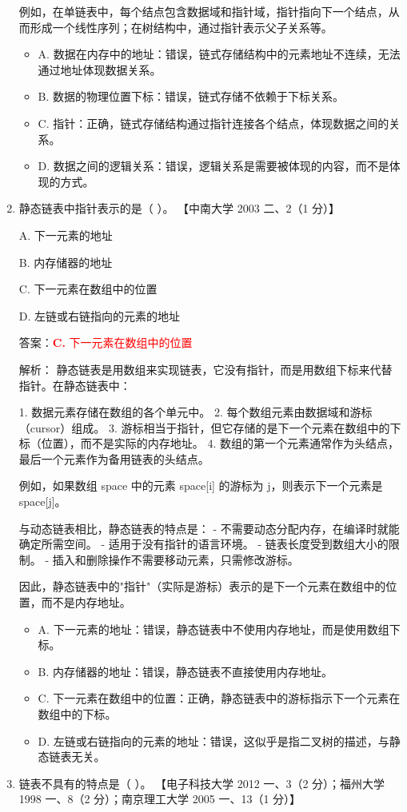 \documentclass[lang=cn,newtx,10pt,scheme=chinese]{../../../elegantbook}
\begin{document}
\begin{enumerate}
        例如，在单链表中，每个结点包含数据域和指针域，指针指向下一个结点，从而形成一个线性序列；在树结构中，通过指针表示父子关系等。

        \begin{itemize}
            \item A. 数据在内存中的地址：错误，链式存储结构中的元素地址不连续，无法通过地址体现数据关系。
            \item B. 数据的物理位置下标：错误，链式存储不依赖于下标关系。
            \item C. 指针：正确，链式存储结构通过指针连接各个结点，体现数据之间的关系。
            \item D. 数据之间的逻辑关系：错误，逻辑关系是需要被体现的内容，而不是体现的方式。
        \end{itemize}
        \item 静态链表中指针表示的是（ ）。  
        【中南大学 2003 二、2（1 分）】  
    
        A. 下一元素的地址  
    
        B. 内存储器的地址 
    
        C. 下一元素在数组中的位置  
    
        D. 左链或右链指向的元素的地址  
    
        答案：\textcolor{red}{\textbf{C.} 下一元素在数组中的位置}

        解析：
        静态链表是用数组来实现链表，它没有指针，而是用数组下标来代替指针。在静态链表中：

        1. 数据元素存储在数组的各个单元中。
        2. 每个数组元素由数据域和游标（cursor）组成。
        3. 游标相当于指针，但它存储的是下一个元素在数组中的下标（位置），而不是实际的内存地址。
        4. 数组的第一个元素通常作为头结点，最后一个元素作为备用链表的头结点。

        例如，如果数组 space 中的元素 space[i] 的游标为 j，则表示下一个元素是 space[j]。

        与动态链表相比，静态链表的特点是：
        - 不需要动态分配内存，在编译时就能确定所需空间。
        - 适用于没有指针的语言环境。
        - 链表长度受到数组大小的限制。
        - 插入和删除操作不需要移动元素，只需修改游标。

        因此，静态链表中的"指针"（实际是游标）表示的是下一个元素在数组中的位置，而不是内存地址。

        \begin{itemize}
            \item A. 下一元素的地址：错误，静态链表中不使用内存地址，而是使用数组下标。
            \item B. 内存储器的地址：错误，静态链表不直接使用内存地址。
            \item C. 下一元素在数组中的位置：正确，静态链表中的游标指示下一个元素在数组中的下标。
            \item D. 左链或右链指向的元素的地址：错误，这似乎是指二叉树的描述，与静态链表无关。
        \end{itemize}
        \item 链表不具有的特点是（ ）。  
        【电子科技大学 2012 一、3（2 分）；福州大学 1998 一、8（2 分）；南京理工大学 2005 一、13（1 分）】 
    

\end{enumerate}
\end{document}
